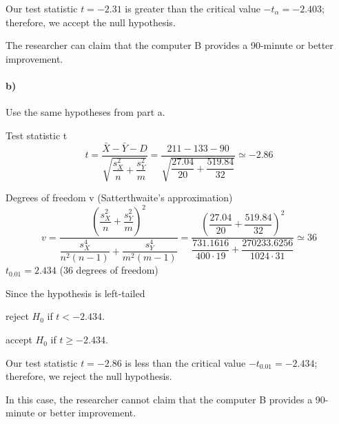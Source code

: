 \documentclass[12pt]{article}
\begin{document}
Our test statistic $t = -2.31$ is greater than the critical value $-t_\alpha = -2.403$; therefore, we accept the null hypothesis.

The researcher can claim that the computer B provides a 90-minute or better improvement.
\paragraph{b)} Use the same hypotheses from part a.

Test statistic t
\[
    t = \frac{\bar{X} - \bar{Y} - D}{\sqrt{\dfrac{s_X^2}{n}+\dfrac{s_Y^2}{m}}} = \frac{211 - 133 - 90}{\sqrt{\dfrac{27.04}{20}+\dfrac{519.84}{32}}} \simeq -2.86
\]

Degrees of freedom v (Satterthwaite's approximation)
\[
    v = \dfrac{(\dfrac{s^2_X}{n}+\dfrac{s^2_Y}{m})^2}{\dfrac{s^4_X}{n^2(n-1)}+\dfrac{s^4_Y}{m^2(m-1)}} = \dfrac{(\dfrac{27.04}{20}+\dfrac{519.84}{32})^2}{\dfrac{731.1616}{400\cdot19}+\dfrac{270233.6256}{1024\cdot31}} \simeq 36
\]
\newpage
$t_{0.01} = 2.434$ (36 degrees of freedom)

Since the hypothesis is left-tailed
\begin{center}
    reject $H_0$ if $t < -2.434$.

    accept $H_0$ if $t \geq -2.434$.
\end{center}

Our test statistic $t = -2.86$ is less than the critical value $-t_{0.01} = -2.434$; therefore, we reject the null hypothesis.

In this case, the researcher cannot claim that the computer B provides a 90-minute or better improvement.
\end{document}
